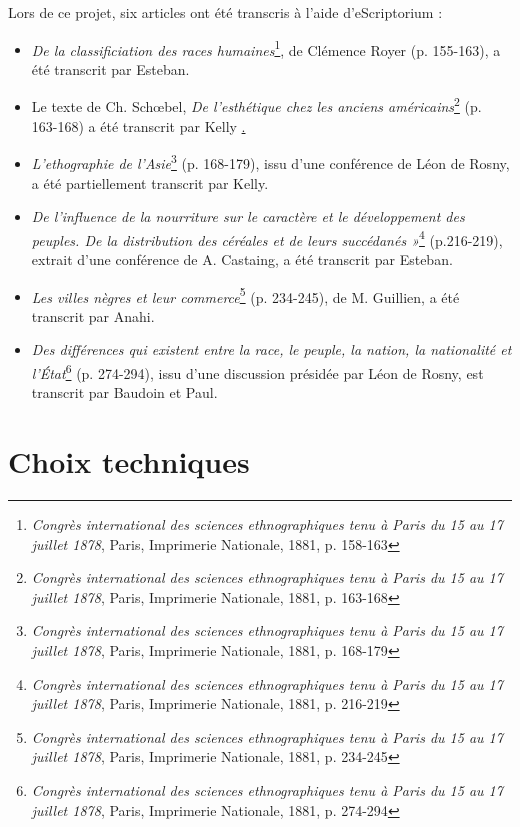 \documentclass{article}
\begin{document}
	Lors de ce projet, six articles ont été transcris à l'aide d'eScriptorium :
	\begin{itemize}
		\item \textit{De la classificiation des races humaines}\footnote{\textit{Congrès international des sciences ethnographiques tenu à Paris du 15 au 17 juillet 1878}, Paris, Imprimerie Nationale, 1881, p. 158-163}, de Clémence Royer (p. 155-163), a été transcrit par Esteban.
		\item Le texte de Ch. Schœbel, \textit{De l’esthétique chez les anciens américains}\footnote{\textit{Congrès international des sciences ethnographiques tenu à Paris du 15 au 17 juillet 1878}, Paris, Imprimerie Nationale, 1881, p. 163-168}  (p. 163-168) a été transcrit par Kelly \underline.
		\item \textit{L'ethographie de l'Asie}\footnote{\textit{Congrès international des sciences ethnographiques tenu à Paris du 15 au 17 juillet 1878}, Paris, Imprimerie Nationale, 1881, p. 168-179} (p. 168-179), issu d'une conférence de Léon de Rosny, a été partiellement transcrit par Kelly.
		\item \textit{De l'influence de la nourriture sur le caractère et le développement des peuples. De la distribution des céréales et de leurs succédanés »}\footnote{\textit{Congrès international des sciences ethnographiques tenu à Paris du 15 au 17 juillet 1878}, Paris, Imprimerie Nationale, 1881, p. 216-219} (p.216-219), extrait d'une conférence de A. Castaing, a été transcrit par Esteban.
		\item \textit{Les villes nègres et leur commerce}\footnote{\textit{Congrès international des sciences ethnographiques tenu à Paris du 15 au 17 juillet 1878}, Paris, Imprimerie Nationale, 1881, p. 234-245} (p. 234-245), de M. Guillien, a été transcrit par Anahi. 
		\item \textit{Des différences qui existent entre la race, le peuple, la nation, la nationalité et l'État}\footnote{\textit{Congrès international des sciences ethnographiques tenu à Paris du 15 au 17 juillet 1878}, Paris, Imprimerie Nationale, 1881, p. 274-294} (p. 274-294), issu d'une discussion présidée par Léon de Rosny, est transcrit par Baudoin et Paul.
	\end{itemize}
	
	
	
	\section{Choix techniques}
	
\end{document}

